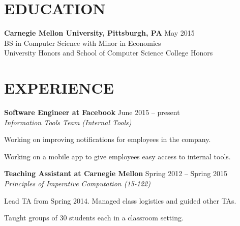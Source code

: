 \documentclass[margin, 11pt]{res} %
\begin{document}
\begin{resume}


\section{EDUCATION}

{\bf Carnegie Mellon University, Pittsburgh, PA} \hfill {\small May 2015}\\
{\small BS in Computer Science with Minor in Economics} \\
{\small University Honors and School of Computer Science College Honors}



\section{EXPERIENCE}

{\bf Software Engineer at Facebook} \hfill {\small June 2015 -- present}\\
{\small {\sl Information Tools Team (Internal Tools)}}
\begin{itemize} \itemsep -2pt
{\small \item Working on improving notifications for employees in the company.}
{\small \item Working on a mobile app to give employees easy access to internal tools.}
\end{itemize}
\vspace{3pt}

{\bf Teaching Assistant at Carnegie Mellon} \hfill {\small Spring 2012 -- Spring 2015}\\
{\small {\sl Principles of Imperative Computation (15-122)}}

\begin{itemize} \itemsep -2pt
{\small \item Lead TA from Spring 2014. Managed class logistics and guided other TAs.
\item Taught groups of 30 students each in a classroom setting.}
\end{itemize}


\end{resume}
\end{document}
